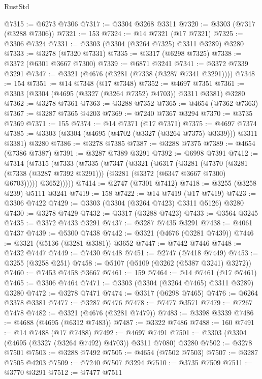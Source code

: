 \begin{lexlean}{RustStd}
\begin{coremodule}
{\begin{coremodule}
{{{{{{{{{{{{{{{{{{{{{{{{{{{{{{{{{@7315 := @6273 @7306
@7317 := @3304 @3268 @3311
@7320 := @3303 (@7317 (@3288 @7306))
@7321 := 153
@7324 := @14 @7321 (@17 @7321)
@7325 := @3306 @7324
@7331 := @3303 (@3304 (@3264 @7325) @3311 @3289) @3280
@7333 := @3278 (@7320 @7331)
@7335 := @3317 (@6298 @7325)
@7338 := @3372 (@6301 @3667 @7300)
@7339 := @6871 @3241
@7341 := @3372 @7339 @3291
@7347 := @3321 (@4676 (@3281 (@7338 (@3287 @7341 @3291))))
@7348 := 154
@7351 := @14 @7348 (@17 @7348)
@7352 := @4697 @7351
@7361 := @3303 (@3304 (@4695 (@3327 (@3264 @7352) @4703)) @3311 @3381) @3280
@7362 := @3278 @7361
@7363 := @3288 @7352
@7365 := @4654 (@7362 @7363)
@7367 := @3287 @7365 @4203
@7369 := @7240 @7367 @3294
@7370 := @3735 @7369
@7371 := 155
@7374 := @14 @7371 (@17 @7371)
@7375 := @4697 @7374
@7385 := @3303 (@3304 (@4695 (@4702 (@3327 (@3264 @7375) @3339))) @3311 @3381) @3280
@7386 := @3278 @7385
@7387 := @3288 @7375
@7389 := @4654 (@7386 @7387)
@7391 := @3287 @7389 @3291
@7392 := @6998 @7391
@7412 := @7314
    (@7315
      (@7333
        (@7335
          (@7347
            (@3321
              (@6317
                (@3281
                  (@7370
                    (@3281 (@7338 (@3287 @7392 @3291)))
                    (@3281 (@3372 (@6347 @3667 @7300) @6703)))))
              @3652)))))
@7414 := @2747 (@7301 @7412)
@7418 := @3255 (@3258 @239) @5111 @3241
@7419 := 158
@7422 := @14 @7419 (@17 @7419)
@7423 := @3306 @7422
@7429 := @3303 (@3304 (@3264 @7423) @3311 @5126) @3280
@7430 := @3278 @7429
@7432 := @3317 (@3288 @7423)
@7433 := @3564 @3245
@7435 := @3372 @7433 @3291
@7437 := @3287 @7435 @3291
@7438 := @4061 @7437
@7439 := @5300 @7438
@7442 := @3321 (@4676 (@3281 @7439))
@7446 := @3321 (@5136 (@3281 @3381)) @3652
@7447 := @7442 @7446
@7448 := @7432 @7447
@7449 := @7430 @7448
@7451 := @2747 (@7418 @7449)
@7453 := @3255 (@3258 @251)
@7458 := @5107 (@5109 (@3262 (@5387 @3241) @3272))
@7460 := @7453 @7458 @3667
@7461 := 159
@7464 := @14 @7461 (@17 @7461)
@7465 := @3306 @7464
@7471 := @3303 (@3304 (@3264 @7465) @3311 @3289) @3280
@7472 := @3278 @7471
@7474 := @3317 (@6298 @7465)
@7476 := @6264 @3378 @3381
@7477 := @3287 @7476
@7478 := @7477 @3571
@7479 := @7267 @7478
@7482 := @3321 (@4676 (@3281 @7479))
@7483 := @3398 @3339
@7486 := @4688 (@4695 (@6312 @7483))
@7487 := @3322 @7486
@7488 := 160
@7491 := @14 @7488 (@17 @7488)
@7492 := @4697 @7491
@7501 := @3303 (@3304 (@4695 (@3327 (@3264 @7492) @4703)) @3311 @7080) @3280
@7502 := @3278 @7501
@7503 := @3288 @7492
@7505 := @4654 (@7502 @7503)
@7507 := @3287 @7505 @4203
@7509 := @7240 @7507 @3294
@7510 := @3735 @7509
@7511 := @3770 @3291
@7512 := @7477 @7511
}}}}}}}}}}}}}}}}}}}}}}}}}}}}}}}}}
\end{coremodule}}
\end{coremodule}
\end{lexlean}
